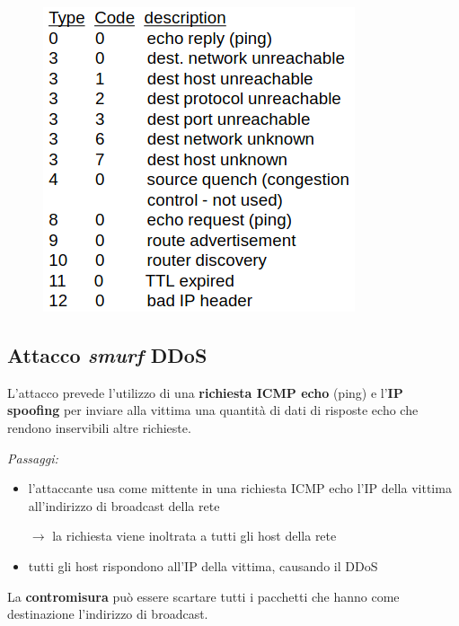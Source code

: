 \begin{figure}[H]
    \centering
    \includegraphics[width=0.6\linewidth]{chapters/8/images/icmp.png}
\end{figure}


\subsection{Attacco \textit{smurf} DDoS}

L'attacco prevede l'utilizzo di una \textbf{richiesta ICMP echo} (ping) e l'\textbf{IP spoofing}
per inviare alla vittima una quantità di dati di risposte echo che rendono inservibili 
altre richieste.

\noindent \textit{Passaggi:}
\begin{itemize}
    \item l'attaccante usa come mittente in una richiesta ICMP echo l'IP della vittima all'indirizzo
    di broadcast della rete 

    $\rightarrow$ la richiesta viene inoltrata a tutti gli host della rete 

    \item tutti gli host rispondono all'IP della vittima, causando il DDoS
\end{itemize}

\noindent La \textbf{contromisura} può essere scartare tutti i pacchetti che hanno come 
destinazione l'indirizzo di broadcast.

\newpage
